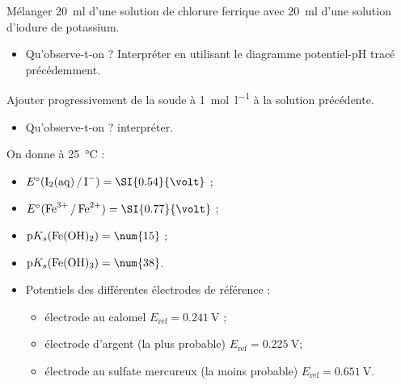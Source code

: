 \documentclass{tp}
\begin{document}
Mélanger \SI{20}{\milli\litre} d'une solution de chlorure ferrique avec \SI{20}{\milli\litre} d'une solution d'iodure de potassium.

\begin{itemize}
  \item Qu'observe-t-on ? Interpréter en utilisant le diagramme potentiel-pH tracé précédemment.
\end{itemize}

Ajouter progressivement de la soude à \SI{1}{\mol\per\litre} à la solution précédente. 

\begin{itemize}
  \item Qu'observe-t-on ? interpréter.
\end{itemize}

On donne à \SI{25}{\celsius} : 
\begin{itemize}
  \item $E^\circ(\ce{I2(aq) / I-})=\SI{0.54}{\volt} $ ;
  \item $E^\circ(\ce{Fe^3+ / Fe^2+})=\SI{0.77}{\volt} $ ;
  \item $\mathrm{p}K_s(\ce{Fe(OH)2})=\num{15}$ ;
  \item $\mathrm{p}K_s(\ce{Fe(OH)3})=\num{38}$.
    \item Potentiels des différentes électrodes de référence :
\begin{itemize}
  \item électrode au calomel $E_\text{ref}=\SI{0.241}{\volt}$ ;
  \item électrode d'argent (la plus probable) $E_\text{ref}=\SI{0.225}{\volt}$;
  \item électrode au sulfate mercureux  (la moins probable) $E_\text{ref}=\SI{0.651}{\volt}$. 
\end{itemize}
\end{itemize}
\end{document}
